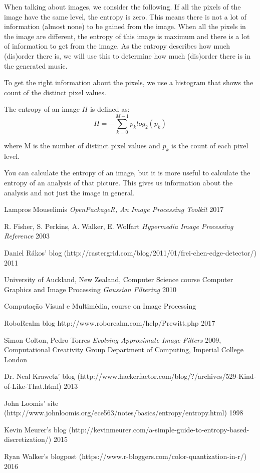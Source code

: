 \documentclass[12pt]{article}
\begin{document}
When talking about images, we consider the following. If all the pixels of the image have the same level, the entropy is zero. This means there is not a lot of information (almost none) to be gained from the image. When all the pixels in the image are different, the entropy of this image is maximum and there is a lot of information to get from the image.
As the entropy describes how much (dis)order there is, we will use this to determine how much (dis)order there is in the generated music.
\newline

To get the right information about the pixels, we use a histogram that shows the count of the distinct pixel values. 
\newline

The entropy of an image $H$ is defined as:
\begin{equation}
H = - \sum_{k=0}^{M-1} p_k log_2 (p_k)
\end{equation}

where M is the number of distinct pixel values and $p_k$ is the count of each pixel level.
\newline

You can calculate the entropy of an image, but it is more useful to calculate the entropy of an analysis of that picture. This gives us information about the analysis and not just the image in general.

\begin{thebibliography}{1}

 Lampros Mouselimis {\em OpenPackageR, An Image Processing Toolkit} 2017

 R. Fisher, S. Perkins, A. Walker, E. Wolfart {\em Hypermedia Image Processing Reference} 2003

 Daniel R\'akos' blog (http://rastergrid.com/blog/2011/01/frei-chen-edge-detector/) 2011

 University of Auckland, New Zealand, Computer Science course Computer Graphics and Image Processing {\em Gaussian Filtering} 2010

 Computaç\~ao Visual e Multimédia, course on Image Processing

 RoboRealm blog {http://www.roborealm.com/help/Prewitt.php} 2017

 Simon Colton, Pedro Torres {\em Evolving Approximate Image Filters} 2009, Computational Creativity Group
Department of Computing, Imperial College London

 Dr. Neal Krawetz' blog (http://www.hackerfactor.com/blog/?/archives/529-Kind-of-Like-That.html) 2013

 John Loomis' site (http://www.johnloomis.org/ece563/notes/basics/entropy/entropy.html) 1998

 Kevin Meurer's blog (http://kevinmeurer.com/a-simple-guide-to-entropy-based-discretization/) 2015

 Ryan Walker's blogpost (https://www.r-bloggers.com/color-quantization-in-r/) 2016

\end{thebibliography}
\end{document}
